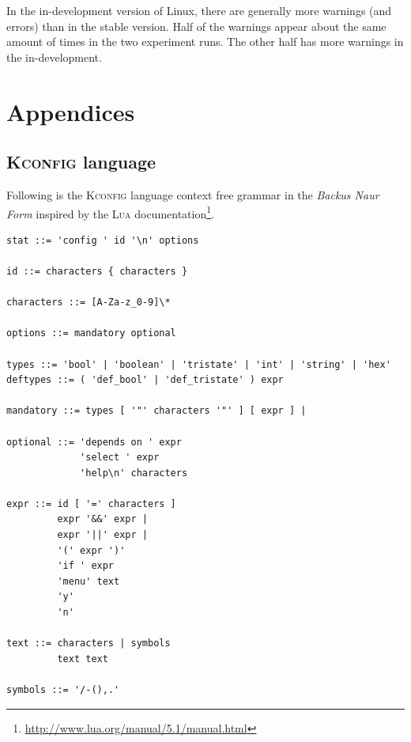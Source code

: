 \documentclass[a4paper,11pt]{report}
\newcommand{\f}{\footnote{\fn}}
\begin{document}
In the in-development version of Linux, there are generally more warnings (and
errors) than in the stable version. Half of the warnings appear about the same
amount of times in the two experiment runs. The other half has more warnings in 
the in-development.




\newpage




            \newpage
            \chapter{Appendices}


            \section{\textsc{Kconfig} language}
            \label{app:kconfig}

            \def \fn {\url{http://www.lua.org/manual/5.1/manual.html}}

Following is the \textsc{Kconfig} language context free grammar in the 
\emph{Backus Naur Form} inspired by the \textsc{Lua} documentation\f.

\begin{verbatim}
stat ::= 'config ' id '\n' options

id ::= characters { characters }

characters ::= [A-Za-z_0-9]\*

options ::= mandatory optional

types ::= 'bool' | 'boolean' | 'tristate' | 'int' | 'string' | 'hex'
deftypes ::= ( 'def_bool' | 'def_tristate' ) expr

mandatory ::= types [ '"' characters '"' ] [ expr ] |

optional ::= 'depends on ' expr
             'select ' expr
             'help\n' characters

expr ::= id [ '=' characters ] 
         expr '&&' expr |
         expr '||' expr |
         '(' expr ')'
         'if ' expr
         'menu' text
         'y'
         'n'

text ::= characters | symbols 
         text text

symbols ::= '/-(),.'

\end{verbatim}


\end{document}
